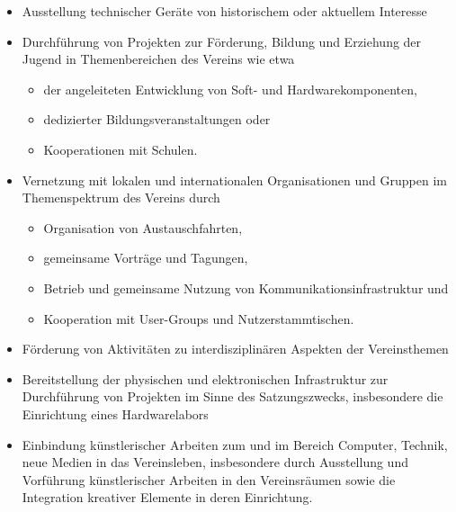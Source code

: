 \documentclass[fontsize=12pt,paper=a4,pagesize]{scrartcl}
\begin{document}
\begin{enumerate}
\begin{itemize}
		\item Ausstellung technischer Geräte von historischem oder aktuellem
			Interesse

		\item Durchführung von Projekten zur Förderung, Bildung und Erziehung
			der Jugend in Themenbereichen des Vereins wie etwa
			\begin{itemize}
				\item der angeleiteten Entwicklung von Soft- und Hardwarekomponenten,
				\item dedizierter Bildungsveranstaltungen oder
				\item Kooperationen mit Schulen.
		\end{itemize}

		\newpage{}

		\item Vernetzung mit lokalen und internationalen Organisationen und
			Gruppen im Themenspektrum des Vereins durch
			\begin{itemize}
				\item Organisation von Austauschfahrten,
				\item gemeinsame Vorträge und Tagungen,
				\item Betrieb und gemeinsame Nutzung von
					Kommunikationsinfrastruktur und
				\item Kooperation mit User-Groups und Nutzerstammtischen.
			\end{itemize}

		\item Förderung von Aktivitäten zu interdisziplinären Aspekten der
			Vereinsthemen

		\item Bereitstellung der physischen und elektronischen Infrastruktur zur
			Durchführung von Projekten im Sinne des Satzungszwecks,
			insbesondere die Einrichtung eines Hardwarelabors

		\item Einbindung künstlerischer Arbeiten zum und im Bereich Computer,
			Technik, neue Medien in das Vereinsleben, insbesondere durch
			Ausstellung und Vorführung künstlerischer Arbeiten in den
			Vereinsräumen sowie die Integration kreativer Elemente in
			deren Einrichtung.
	\end{itemize}
\end{enumerate}
\end{document}

